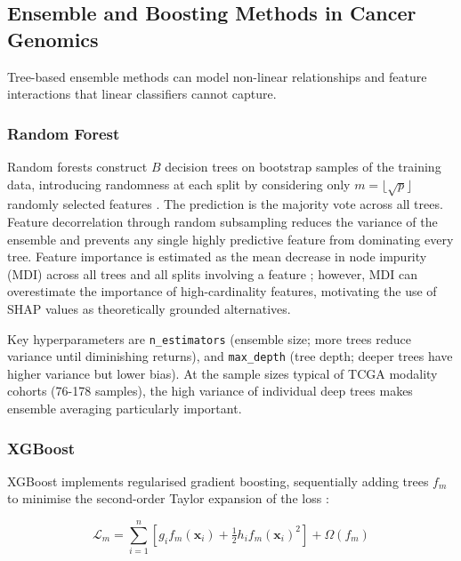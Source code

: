 \subsection{Ensemble and Boosting Methods in Cancer Genomics}

Tree-based ensemble methods can model non-linear relationships and feature interactions that linear classifiers cannot capture.

\subsubsection{Random Forest}

Random forests construct $B$ decision trees on bootstrap samples of the training data, introducing randomness at each split by considering only $m = \lfloor\sqrt{p}\rfloor$ randomly selected features \parencite{Breiman2001}. The prediction is the majority vote across all trees. Feature decorrelation through random subsampling reduces the variance of the ensemble and prevents any single highly predictive feature from dominating every tree. Feature importance is estimated as the mean decrease in node impurity (MDI) across all trees and all splits involving a feature \parencite{Breiman2001}; however, MDI can overestimate the importance of high-cardinality features, motivating the use of SHAP values as theoretically grounded alternatives.
 
Key hyperparameters are \texttt{n\_estimators} (ensemble size; more trees reduce variance until diminishing returns), and \texttt{max\_depth} (tree depth; deeper trees have higher variance but lower bias). At the sample sizes typical of TCGA modality cohorts (76-178 samples), the high variance of individual deep trees makes ensemble averaging particularly important.

\subsubsection{XGBoost}


XGBoost implements regularised gradient boosting, sequentially adding trees $f_m$ to minimise the second-order Taylor expansion of the loss
\parencite{Chen2016}:
 
\begin{equation}
\mathcal{L}_m = \sum_{i=1}^{n}\!\left[
    g_i f_m(\mathbf{x}_i)
    + \tfrac{1}{2} h_i f_m(\mathbf{x}_i)^2
\right] + \Omega(f_m)
\label{eq:xgb_loss}
\end{equation}
 
